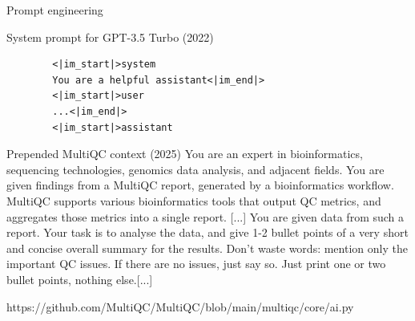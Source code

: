 \documentclass[10pt]{beamer}
\newcommand{\credit}[1]{{\par \raggedleft \scriptsize \mdseries \color{mDarkBrown} #1 \par}}
\begin{document}
\begin{frame}[fragile]{Prompt engineering}
	
	\begin{alertblock}{System prompt for GPT-3.5 Turbo (2022) }
		\small
		\begin{verbatim}
		<|im_start|>system
		You are a helpful assistant<|im_end|>
		<|im_start|>user
		...<|im_end|>
		<|im_start|>assistant
		\end{verbatim}
	\end{alertblock}
	\begin{alertblock}{Prepended MultiQC context (2025)}
		\small
		You are an expert in bioinformatics, sequencing technologies, genomics data analysis, and adjacent fields. You are given findings from a MultiQC report, generated by a bioinformatics workflow. MultiQC supports various bioinformatics tools that output QC metrics, and aggregates those metrics into a single report. [...] You are given data from such a report. Your task is to analyse the data, and give 1-2 bullet points of a very short and concise overall summary for the results. Don't waste words: mention only the important QC issues. If there are no issues, just say so. Just print one or two bullet points, nothing else.[...]
	\end{alertblock}
	\credit{https://github.com/MultiQC/MultiQC/blob/main/multiqc/core/ai.py}
\end{frame}
\end{document}
